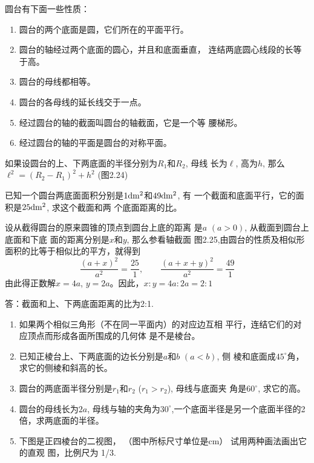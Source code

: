 圆台有下面一些性质：
\begin{enumerate}
\item 圆台的两个底面是圆，它们所在的平面平行。
\item 圆台的轴经过两个底面的圆心，并且和底面垂直，
连结两底圆心线段的长等于高。
\item 圆台的母线都相等。
\item 圆台的各母线的延长线交于一点。
\item 经过圆台的轴的截面叫圆台的轴截面，它是一个等
腰梯形。
\item 经过圆台的轴的平面是圆台的对称平面。
\end{enumerate}

如果设圆台的上、下两底面的半径分别为$R_1$和$R_2$, 母线
长为$\ell$, 高为$h$, 那么$\ell^2=(R_2-R_1)^2+h^2$ (图2.24)

\begin{example}
    已知一个圆台两底面面积分别是$1{\rm dm^2}$和$49{\rm dm^2}$, 有
    一个截面和底面平行，它的面积是$25{\rm dm^2}$, 求这个截面和两
    个底面距离的比。
\end{example}

\begin{figure}[htp]
    \centering
{}
    \caption{}
\end{figure}

\begin{solution}
    设从截得圆台的原来圆锥的顶点到圆台上底的距离
是$a$ $(a>0)$, 从截面到圆台上底面和下底
面的距离分别是$x$和$y$, 那么参看轴截面
图2.25,由圆台的性质及相似形面积的比等于相似比的平方，就得到
\[\frac{(a+x)^2}{a^2}=\frac{25}{1},\qquad \frac{(a+x+y)^2}{a^2}=\frac{49}{1}\]
由此得正数解$x=4a$, $y=2a$。因此，$x:y=4a:2a=2:1$

答：截面和上、下两底面距离的比为2:1.
\end{solution}



\begin{ex}
\begin{enumerate}
    \item 如果两个相似三角形（不在同一平面内）的对应边互相
    平行，连结它们的对应顶点而形成各面所围成的几何体
    是不是棱台。
    \item 已知正棱台上、下两底面的边长分别是$a$和$b$ $(a<b)$, 侧
    棱和底面成$45^{\circ}$角，求它的侧棱和斜高的长。
    \item 圆台的两底面半径分别是$r_1$和$r_2$ ($r_1>r_2$), 母线与底面夹
    角是$60^{\circ}$, 求它的高。
    \item 圆台的母线长为$2a$, 母线与轴的夹角为$30^{\circ}$,一个底面半径是另一个底面半径的2倍，求两底面的半径。
    \item 下图是正四棱台的二视图，
    （图中所标尺寸单位是cm）
    试用两种画法画出它的直观
    图，比例尺为
    1/3.
\end{enumerate}
\end{ex}

